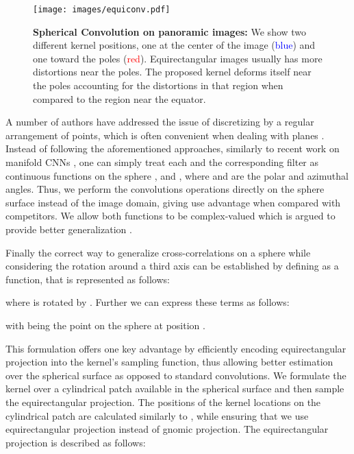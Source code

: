 \documentclass[final]{cvpr}
\begin{document}
\begin{figure}[!t]
    \centering
    \texttt{[image: images/equiconv.pdf]}
    \caption{\textbf{Spherical Convolution on panoramic images:} We show two different kernel positions, one at the center of the image (\textcolor{blue}{blue}) and one toward the poles (\textcolor{red}{red}). Equirectangular images usually has more distortions near the poles. The proposed kernel deforms itself near the poles accounting for the distortions in that region when compared to the region near the equator.
}
    \label{fig:equiconv}
\end{figure}



A number of authors have addressed the issue of discretizing  by a regular arrangement of points, which is often convenient when dealing with planes  \cite{boomsma2017spherical,su2017learning}. 
Instead of following the aforementioned approaches, similarly to recent work on manifold CNNs 
\cite{masci2015geodesic,monti2017geometric}, 
one can simply treat each  and the corresponding filter  
as continuous functions on the sphere \cite{kondor2018clebschgordan},  and , 
where  and  are the polar and azimuthal angles. 
Thus, we perform the convolutions operations directly on the sphere surface instead of the image domain, giving use advantage when compared with competitors.
We allow both functions to be complex-valued which is argued to provide better generalization \cite{kondor2018clebschgordan}.





















Finally the correct way to generalize cross-correlations on a sphere while considering the rotation around a third axis \cite{kondor2018clebschgordan} can be established by defining  as a function, that is represented as follows:



where  is  rotated by . Further we can express these terms as follows:

with  being the point on the sphere at position  . 

This formulation offers one key advantage by efficiently encoding equirectangular projection into the kernel's sampling function, thus allowing better estimation over the spherical surface as opposed to standard convolutions. We formulate the kernel over a cylindrical patch available in the spherical surface and then sample the equirectangular projection. The positions of the kernel locations on the cylindrical patch are calculated similarly to \cite{coors2018spherenet}, while ensuring that we use equirectangular projection instead of gnomic projection. The equirectangular projection is described as follows: 
\end{document}
